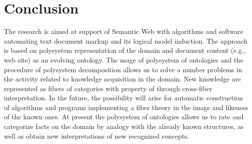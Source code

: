 \documentclass[conference]{IEEEtran}
\begin{document}
%





\section{Conclusion}

The research is aimed at support of Semantic Web with algorithms and
software automating text document markup and its logical model
induction.  The approach is based on polysystem representation of the
domain and document content (e.g., web site) as an evolving ontology.
The usage of polysystem of ontologies and the procedure of polysystem
decomposition \cite{father} allows us to solve a number problems in
the activity related to knowledge acquisition in the domain.  New
knowledge are represented as fibers of categories with property of
through cross-fiber interpretation.  In the future, the possibility
will arise for automatic construction of algorithms and programs
implementing a fiber theory in the image and likeness of the known
ones.  At present the polysystem of ontologies allows us to rate and
categorize facts on the domain by analogy with the already known
structures, as well as obtain new interpretations of new recognized
concepts.
\end{document}
